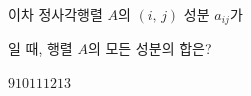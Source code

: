 이차 정사각행렬 $A$의 $(i,\,j)$ 성분 $a_{ij}$가\par\smallskip{}\par\smallskip\noindent 일 때, 행렬 $A$의 모든 성분의 합은?
\begin{choices32}{$9$}{$10$}{$11$}{$12$}{$13$}\end{choices32}

